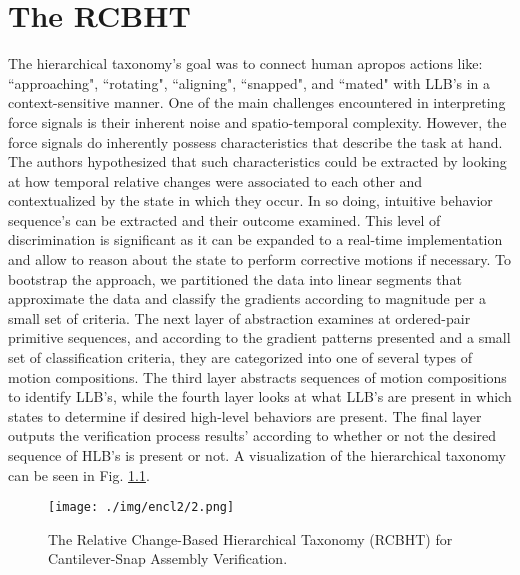 %

\chapter{The RCBHT}\label{sec:RCBHT}



The hierarchical taxonomy's goal was to connect human apropos actions like: ``approaching", ``rotating", ``aligning", ``snapped", and ``mated" with LLB's in a context-sensitive manner. One of the main challenges encountered in interpreting force signals is their inherent noise and spatio-temporal complexity. However, the force signals do inherently possess characteristics that describe the task at hand. The authors hypothesized that such characteristics could be extracted by looking at how temporal relative changes were associated to each other and contextualized by the state in which they occur. In so doing, intuitive behavior sequence's can be extracted and their outcome examined. This level of discrimination is significant as it can be expanded to a real-time implementation and allow to reason about the state to perform corrective motions if necessary.
To bootstrap the approach, we partitioned the data into linear segments that approximate the data and classify the gradients according to magnitude per a small set of criteria. The next layer of abstraction examines at ordered-pair primitive sequences, and according to the gradient patterns presented and a small set of classification criteria, they are categorized into one of several types of motion compositions. The third layer abstracts sequences of motion compositions to identify LLB's, while the fourth layer looks at what LLB's are present in which states to determine if desired high-level behaviors are present. The final layer outputs the verification process results' according to whether or not the desired sequence of HLB's is present or not. A visualization of the hierarchical taxonomy can be seen in Fig. \ref{fig:Taxonomy}.
\begin{figure}[h]
    \centering
    \texttt{[image: ./img/encl2/2.png]}
    \caption{The Relative Change-Based Hierarchical Taxonomy (RCBHT) for Cantilever-Snap Assembly Verification.}
    \label{fig:Taxonomy}
\end{figure}
